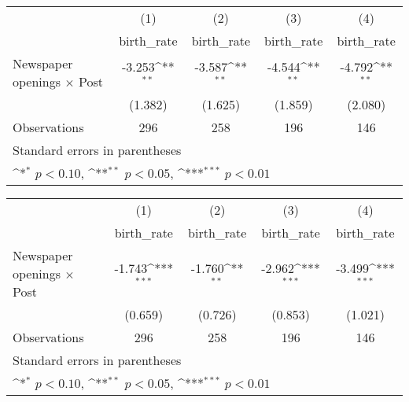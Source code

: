 {
\def\sym#1{\ifmmode^{#1}\else\(^{#1}\)\fi}
\begin{tabular}{l*{4}{c}}
\hline\hline
                    &\multicolumn{1}{c}{(1)}&\multicolumn{1}{c}{(2)}&\multicolumn{1}{c}{(3)}&\multicolumn{1}{c}{(4)}\\
                    &\multicolumn{1}{c}{birth\_rate}&\multicolumn{1}{c}{birth\_rate}&\multicolumn{1}{c}{birth\_rate}&\multicolumn{1}{c}{birth\_rate}\\
\hline
Newspaper openings $\times$ Post&      -3.253\sym{**} &      -3.587\sym{**} &      -4.544\sym{**} &      -4.792\sym{**} \\
                    &     (1.382)         &     (1.625)         &     (1.859)         &     (2.080)         \\
\hline
Observations        &         296         &         258         &         196         &         146         \\
\hline\hline
\multicolumn{5}{l}{\footnotesize Standard errors in parentheses}\\
\multicolumn{5}{l}{\footnotesize \sym{*} \(p<0.10\), \sym{**} \(p<0.05\), \sym{***} \(p<0.01\)}\\
\end{tabular}
}
{
\def\sym#1{\ifmmode^{#1}\else\(^{#1}\)\fi}
\begin{tabular}{l*{4}{c}}
\hline\hline
                    &\multicolumn{1}{c}{(1)}&\multicolumn{1}{c}{(2)}&\multicolumn{1}{c}{(3)}&\multicolumn{1}{c}{(4)}\\
                    &\multicolumn{1}{c}{birth\_rate}&\multicolumn{1}{c}{birth\_rate}&\multicolumn{1}{c}{birth\_rate}&\multicolumn{1}{c}{birth\_rate}\\
\hline
Newspaper openings $\times$ Post&      -1.743\sym{***}&      -1.760\sym{**} &      -2.962\sym{***}&      -3.499\sym{***}\\
                    &     (0.659)         &     (0.726)         &     (0.853)         &     (1.021)         \\
\hline
Observations        &         296         &         258         &         196         &         146         \\
\hline\hline
\multicolumn{5}{l}{\footnotesize Standard errors in parentheses}\\
\multicolumn{5}{l}{\footnotesize \sym{*} \(p<0.10\), \sym{**} \(p<0.05\), \sym{***} \(p<0.01\)}\\
\end{tabular}
}

